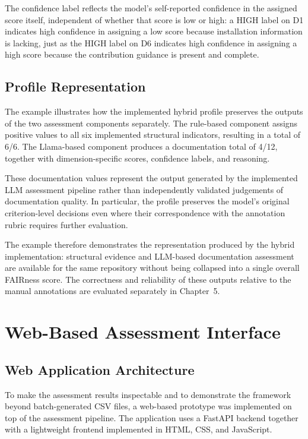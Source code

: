 The confidence label reflects the model's self-reported confidence in
the assigned score itself, independent of whether that score is low or
high: a HIGH label on D1 indicates high confidence in assigning a low
score because installation information is lacking, just as the HIGH
label on D6 indicates high confidence in assigning a high score because
the contribution guidance is present and complete.

\subsection{Profile Representation}

The example illustrates how the implemented hybrid profile preserves
the outputs of the two assessment components separately. The
rule-based component assigns positive values to all six implemented
structural indicators, resulting in a total of 6/6. The Llama-based
component produces a documentation total of 4/12, together with
dimension-specific scores, confidence labels, and reasoning.

These documentation values represent the output generated by the
implemented LLM assessment pipeline rather than independently validated
judgements of documentation quality. In particular, the profile
preserves the model's original criterion-level decisions even where
their correspondence with the annotation rubric requires further
evaluation.

The example therefore demonstrates the representation produced by the
hybrid implementation: structural evidence and LLM-based documentation
assessment are available for the same repository without being
collapsed into a single overall FAIRness score. The correctness and
reliability of these outputs relative to the manual annotations are
evaluated separately in Chapter~5.

\section{Web-Based Assessment Interface}

\subsection{Web Application Architecture}

To make the assessment results inspectable and to demonstrate the
framework beyond batch-generated CSV files, a web-based prototype was
implemented on top of the assessment pipeline. The application uses a
FastAPI backend together with a lightweight frontend implemented in
HTML, CSS, and JavaScript.


